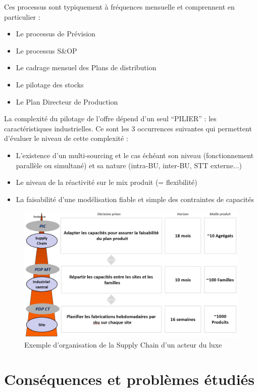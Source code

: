 Ces processus sont typiquement à fréquences mensuelle et comprennent en particulier :
\begin{itemize}
  \item Le processus de Prévision
  \item Le processus S\&OP
  \item Le cadrage mensuel des Plans de distribution
  \item Le pilotage des stocks
  \item Le Plan Directeur de Production
\end{itemize}

La complexité du pilotage de l’offre dépend d’un seul ``PILIER'' : les caractéristiques industrielles. Ce sont les 3 occurrences suivantes qui permettent d’évaluer le niveau de cette complexité :
\begin{itemize}
  \item L’existence d’un multi-sourcing et le cas échéant son niveau (fonctionnement parallèle ou simultané) et sa nature (intra-BU, inter-BU, STT externe...)
  \item Le niveau de la réactivité sur le mix produit (= flexibilité)
  \item La faisabilité d’une modélisation fiable et simple des contraintes de capacités
\end{itemize}


\begin{figure}[h]
  \centering
  \includegraphics[width=\textwidth]{main/introduction/images/exemple_SC_luxe.png}
  \caption{Exemple d'organisation de la Supply Chain d'un acteur du luxe}
  \label{fig:exemple-SC-luxe}
\end{figure}


\section{Conséquences et problèmes étudiés}



